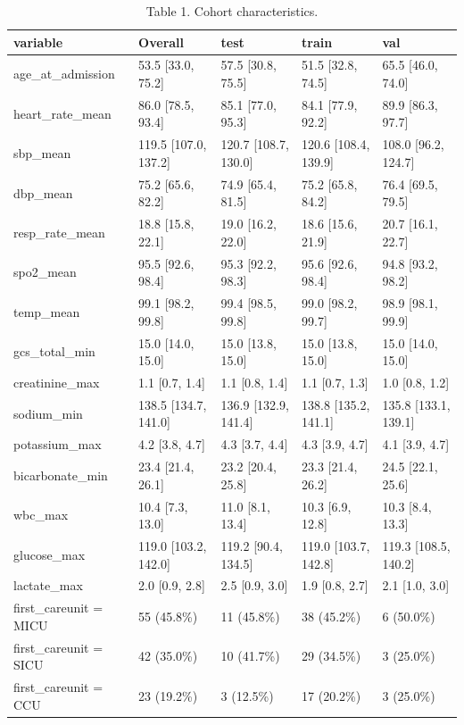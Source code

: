 \begin{table}[htbp]
\centering
\caption{Table 1. Cohort characteristics.}
\label{table1_cohort}
\begin{tabular}{lllll}
\toprule
variable & Overall & test & train & val \\
\midrule
age\_at\_admission & 53.5 [33.0, 75.2] & 57.5 [30.8, 75.5] & 51.5 [32.8, 74.5] & 65.5 [46.0, 74.0] \\
heart\_rate\_mean & 86.0 [78.5, 93.4] & 85.1 [77.0, 95.3] & 84.1 [77.9, 92.2] & 89.9 [86.3, 97.7] \\
sbp\_mean & 119.5 [107.0, 137.2] & 120.7 [108.7, 130.0] & 120.6 [108.4, 139.9] & 108.0 [96.2, 124.7] \\
dbp\_mean & 75.2 [65.6, 82.2] & 74.9 [65.4, 81.5] & 75.2 [65.8, 84.2] & 76.4 [69.5, 79.5] \\
resp\_rate\_mean & 18.8 [15.8, 22.1] & 19.0 [16.2, 22.0] & 18.6 [15.6, 21.9] & 20.7 [16.1, 22.7] \\
spo2\_mean & 95.5 [92.6, 98.4] & 95.3 [92.2, 98.3] & 95.6 [92.6, 98.4] & 94.8 [93.2, 98.2] \\
temp\_mean & 99.1 [98.2, 99.8] & 99.4 [98.5, 99.8] & 99.0 [98.2, 99.7] & 98.9 [98.1, 99.9] \\
gcs\_total\_min & 15.0 [14.0, 15.0] & 15.0 [13.8, 15.0] & 15.0 [13.8, 15.0] & 15.0 [14.0, 15.0] \\
creatinine\_max & 1.1 [0.7, 1.4] & 1.1 [0.8, 1.4] & 1.1 [0.7, 1.3] & 1.0 [0.8, 1.2] \\
sodium\_min & 138.5 [134.7, 141.0] & 136.9 [132.9, 141.4] & 138.8 [135.2, 141.1] & 135.8 [133.1, 139.1] \\
potassium\_max & 4.2 [3.8, 4.7] & 4.3 [3.7, 4.4] & 4.3 [3.9, 4.7] & 4.1 [3.9, 4.7] \\
bicarbonate\_min & 23.4 [21.4, 26.1] & 23.2 [20.4, 25.8] & 23.3 [21.4, 26.2] & 24.5 [22.1, 25.6] \\
wbc\_max & 10.4 [7.3, 13.0] & 11.0 [8.1, 13.4] & 10.3 [6.9, 12.8] & 10.3 [8.4, 13.3] \\
glucose\_max & 119.0 [103.2, 142.0] & 119.2 [90.4, 134.5] & 119.0 [103.7, 142.8] & 119.3 [108.5, 140.2] \\
lactate\_max & 2.0 [0.9, 2.8] & 2.5 [0.9, 3.0] & 1.9 [0.8, 2.7] & 2.1 [1.0, 3.0] \\
first\_careunit = MICU & 55 (45.8\%) & 11 (45.8\%) & 38 (45.2\%) & 6 (50.0\%) \\
first\_careunit = SICU & 42 (35.0\%) & 10 (41.7\%) & 29 (34.5\%) & 3 (25.0\%) \\
first\_careunit = CCU & 23 (19.2\%) & 3 (12.5\%) & 17 (20.2\%) & 3 (25.0\%) \\

\end{tabular}
\end{table}
